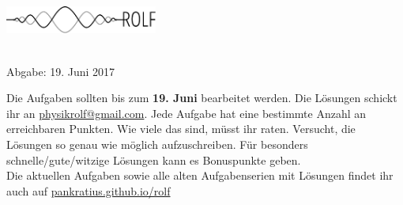 \documentclass[a4paper]{article}
\begin{document}
\vspace*{-1cm}
\parbox{4cm}{\vspace{-0.2cm}\includegraphics[width=5cm]{../images/logo_scaled.pdf}}
\parbox{10.6cm}{ \\
		Abgabe: 19. Juni 2017 \\ \vspace*{-.5cm} }
	\vspace{0.5cm}	
	

\thispagestyle{empty}
\begin{framed}
	\noindent
	\scriptsize
	Die Aufgaben sollten bis zum \textbf{19. Juni} bearbeitet werden. Die Lösungen schickt ihr an \href{mailto:physikrolf@gmail.com}{physikrolf@gmail.com}.
	Jede Aufgabe hat eine bestimmte Anzahl an erreichbaren Punkten. Wie viele das sind, müsst ihr raten. Versucht, die Lösungen so genau wie möglich aufzuschreiben. Für besonders schnelle/gute/witzige Lösungen kann es Bonuspunkte geben.\\ Die aktuellen Aufgaben sowie alle alten Aufgabenserien mit Lösungen findet ihr auch auf \url{pankratius.github.io/rolf}
\end{framed}

\noindent







%
%
\end{document}
